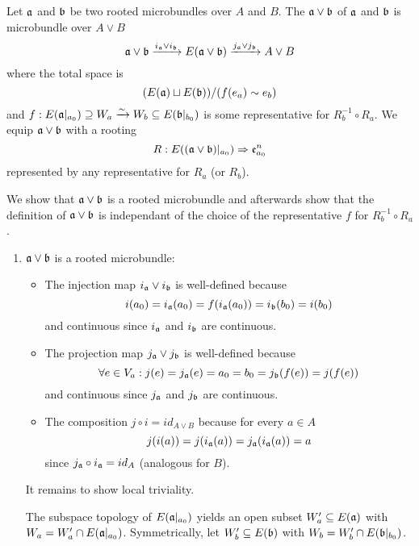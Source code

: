 \begin{mydefinition}
    Let $\mathfrak{a}$ and $\mathfrak{b}$ be two rooted microbundles over $A$ and $B$.
    The  $\mathfrak{a} \vee \mathfrak{b}$ of $\mathfrak{a}$ and $\mathfrak{b}$ is microbundle over $A \vee B$
    \[ \mathfrak{a} \vee \mathfrak{b} \xrightarrow{i_{\mathfrak{a}} \vee i_{\mathfrak{b}}} E(\mathfrak{a} \vee \mathfrak{b}) \xrightarrow{j_{\mathfrak{a}} \vee j_{\mathfrak{b}}} A \vee B \]
    where the total space is
    \[ (E(\mathfrak{a}) \sqcup E(\mathfrak{b})) / (f(e_a) \sim e_b) \]
    and $f: E(\mathfrak{a}\vert_{a_0}) \supseteq{} W_a \xrightarrow{\sim} W_b \subseteq{} E(\mathfrak{b}\vert_{b_0})$ is some representative for $R_b^{-1} \circ R_a$.
    We equip $\mathfrak{a} \vee \mathfrak{b}$ with a rooting
    \[ R: E((\mathfrak{a} \vee \mathfrak{b})\vert_{a_0}) \Rightarrow{} \mathfrak{e}^n_{a_0} \]
    represented by any representative for $R_a$ (or $R_b$).
\end{mydefinition}
\begin{myproof}
    We show that $\mathfrak{a} \vee \mathfrak{b}$ is a rooted microbundle and afterwards show
    that the definition of $\mathfrak{a} \vee \mathfrak{b}$ is independant of the choice of the representative $f$ for $R_b^{-1} \circ R_a$.
    \begin{enumerate}
        \item $\mathfrak{a} \vee \mathfrak{b}$ is a rooted microbundle:
        \begin{itemize}
            \item The injection map $i_{\mathfrak{a}} \vee i_{\mathfrak{b}}$ is well-defined because 
            \[ i(a_0) = i_{\mathfrak{a}}(a_0) = f(i_{\mathfrak{a}}(a_0)) = i_{\mathfrak{b}}(b_0) = i(b_0) \]
            and continuous since $i_{\mathfrak{a}}$ and $i_{\mathfrak{b}}$ are continuous.
            \item The projection map $j_{\mathfrak{a}} \vee j_{\mathfrak{b}}$ is well-defined because
            \[ \forall e \in V_a: j(e) = j_{\mathfrak{a}}(e) = a_0 = b_0 = j_{\mathfrak{b}}(f(e)) = j(f(e)) \]
            and continuous since $j_{\mathfrak{a}}$ and $j_{\mathfrak{b}}$ are continuous.
            \item The composition $j \circ i = id_{A \vee B}$ because for every $a \in A$
            \[ j(i(a)) = j(i_{\mathfrak{a}}(a)) = j_{\mathfrak{a}}(i_{\mathfrak{a}}(a)) = a \]
            since $j_{\mathfrak{a}} \circ i_{\mathfrak{a}} = id_A$ (analogous for $B$).
        \end{itemize}
        It remains to show local triviality.

        The subspace topology of $E(\mathfrak{a}\vert_{a_0})$ yields an open subset $W_a' \subseteq{} E(\mathfrak{a})$ with $W_a = W_a' \cap E(\mathfrak{a}\vert_{a_0})$.
        Symmetrically, let $W_b' \subseteq{} E(\mathfrak{b})$ with $W_b = W_b' \cap E(\mathfrak{b}\vert_{b_0})$.


\end{enumerate}
\end{myproof}
